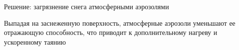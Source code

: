 \documentclass[unicode]{beamer}
\begin{document}
\begin{frame}{Решение: загрязнение снега атмосферными аэрозолями}

\footnotesize
\begin{block}{}  
    Выпадая на заснеженную поверхность, атмосферные аэрозоли уменьшают ее отражающую способность, что приводит к дополнительному нагреву и ускоренному таянию
\end{block} 


\scriptsize
\begin{figure}[h]
    \begin{minipage}[h]{0.49\linewidth}
    \end{minipage}
    \begin{minipage}[h]{0.5\linewidth}
    \end{minipage}
\end{figure}


\end{frame}
\end{document}
